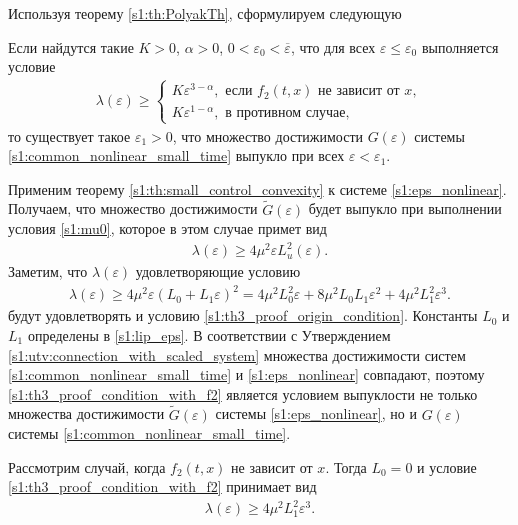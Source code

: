 \documentclass[../main.tex]{subfiles}
\begin{document}
Используя теорему \ref{s1:th:PolyakTh}, сформулируем следующую
\begin{theorem}\label{s1:th:small_time_convexity}
     Если найдутся такие $K > 0$, $ \alpha > 0$, $ 0 < \varepsilon_0 < \overline{\varepsilon}$, что для всех $\varepsilon \leqslant \varepsilon_0$ выполняется условие
     \begin{gather}\label{s1:small_time_convexity_condition}
         \lambda(\varepsilon) \geqslant \left\{ {\begin{array}{*{20}{l}}
         {K\varepsilon ^{3 - \alpha}, \mbox{\ если \ } f_2(t,x) \mbox{\ не зависит от \ } x}, \\
         {K\varepsilon ^{1 - \alpha}}, \mbox{\ в противном случае},
         \end{array}} \right.
     \end{gather}
  то существует такое $ \varepsilon_1 > 0 $, что множество достижимости $G(\varepsilon)$ системы \eqref{s1:common_nonlinear_small_time} выпукло при всех $\varepsilon < \varepsilon_1 $.
 \end{theorem}
 \doc
Применим теорему \ref{s1:th:small_control_convexity} к системе \eqref{s1:eps_nonlinear}. 
Получаем, что множество достижимости $\widetilde{G}(\varepsilon)$ будет выпукло при выполнении  условия \eqref{s1:mu0}, которое в этом случае примет вид
 \begin{gather}\label{s1:th3_proof_origin_condition}
     \lambda(\varepsilon) \geqslant 4 \mu^2 \varepsilon L_u^2 (\varepsilon).
 \end{gather}
 Заметим, что $ \lambda(\varepsilon)  $ удовлетворяющие условию 
 \begin{gather}\label{s1:th3_proof_condition_with_f2}
 	 \lambda(\varepsilon) \geqslant 4 \mu^2 \varepsilon (L_0 + L_1  \varepsilon)^2 = 4 \mu^2 L_0^2 \varepsilon  + 8 \mu^2 L_0 L_1 \varepsilon^2 +  4 \mu^2  L_1^2 \varepsilon^3.
 \end{gather}
 будут удовлетворять и условию \eqref{s1:th3_proof_origin_condition}. 
 Константы $L_0$ и $L_1$ определены в \eqref{s1:lip_eps}.  
 В соответствии с Утверждением \ref{s1:utv:connection_with_scaled_system} множества достижимости систем  \eqref{s1:common_nonlinear_small_time} и \eqref{s1:eps_nonlinear} совпадают, поэтому \eqref{s1:th3_proof_condition_with_f2} является условием выпуклости не только множества достижимости $\widetilde{G}(\varepsilon)$ системы  \eqref{s1:eps_nonlinear}, но и $G(\varepsilon)$ системы \eqref{s1:common_nonlinear_small_time}.
 
 Рассмотрим случай, когда  $f_2(t,x)$ не зависит от $x$.
 Тогда  $L_0 = 0$ и условие \eqref{s1:th3_proof_condition_with_f2} принимает вид
 \begin{gather}\label{s1:th3_proof_condition_without_f2}
 	\lambda(\varepsilon) \geqslant   4 \mu^2  L_1^2 \varepsilon^3.
 \end{gather}
 
\end{document}
